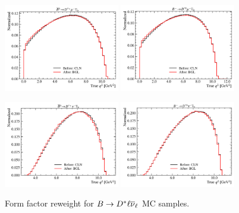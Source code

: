 \begin{figure}[htb]
    \centering
    \includegraphics[width=0.45\textwidth]{
        ./figs-mc-correction/reweighting-form-factors/norm/DstMu.pdf
    }
    \includegraphics[width=0.45\textwidth]{
        ./figs-mc-correction/reweighting-form-factors/norm/Dst0Mu.pdf
    }

    \includegraphics[width=0.45\textwidth]{
        ./figs-mc-correction/reweighting-form-factors/sig/DstTau.pdf
    }
    \includegraphics[width=0.45\textwidth]{
        ./figs-mc-correction/reweighting-form-factors/sig/Dst0Tau.pdf
    }
    \caption{
        Form factor reweight for $B \rightarrow {\ensuremath{D}}^* {\ell}{{\overline{\nu}}_\ell}$ MC samples.
    }
    \label{fig:ff-dst}
\end{figure}


